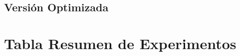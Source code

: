 \documentclass[11pt,a4paper]{article}
\begin{document}
\subsection{Versión Optimizada}

\section{Tabla Resumen de Experimentos}
\end{document}
